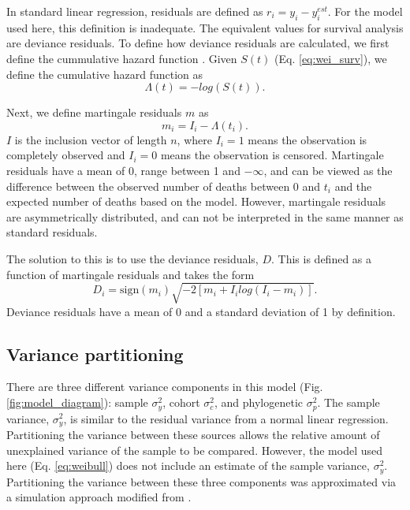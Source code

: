 \documentclass[12pt,letterpaper]{article}
\begin{document}
In standard linear regression, residuals are defined as \(r_{i} = y_{i} - y_{i}^{est}\). For the model used here, this definition is inadequate. The equivalent values for survival analysis are deviance residuals. To define how deviance residuals are calculated, we first define the cummulative hazard function \citep{Klein2003}. Given \(S(t)\) (Eq. \ref{eq:wei_surv}), we define the cumulative hazard function as 
\begin{equation*}
  \Lambda(t) = -log\left(S\left(t\right)\right).
\end{equation*}

Next, we define martingale residuals \(m\) as
\begin{equation*}
  m_{i} = I_{i} - \Lambda(t_i).
\end{equation*}
\(I\) is the inclusion vector of length \(n\), where \(I_{i} = 1\) means the observation is completely observed and \(I_{i} = 0\) means the observation is censored. Martingale residuals have a mean of 0, range between 1 and \(-\infty\), and can be viewed as the difference between the observed number of deaths between 0 and \(t_{i}\) and the expected number of deaths based on the model. However, martingale residuals are asymmetrically distributed, and can not be interpreted in the same manner as standard residuals. 

The solution to this is to use the deviance residuals, \(D\). This is defined as a function of martingale residuals and takes the form
\begin{equation*}
  D_{i} = \text{sign}(m_{i}) \sqrt{-2[m_{i} + I_{i}log(I_{i} - m_{i})]}.
\end{equation*}
Deviance residuals have a mean of 0 and a standard deviation of 1 by definition.


\subsection{Variance partitioning}
There are three different variance components in this model (Fig. \ref{fig:model_diagram}): sample \(\sigma_{y}^{2}\), cohort \(\sigma_{c}^{2}\), and phylogenetic \(\sigma_{p}^{2}\). The sample variance, \(\sigma_{y}^{2}\), is similar to the residual variance from a normal linear regression. Partitioning the variance between these sources allows the relative amount of unexplained variance of the sample to be compared. However, the model used here (Eq. \ref{eq:weibull}) does not include an estimate of the sample variance, \(\sigma_{y}^{2}\). Partitioning the variance between these three components was approximated via a simulation approach modified from \citet{Goldstein2002}.
\end{document}
